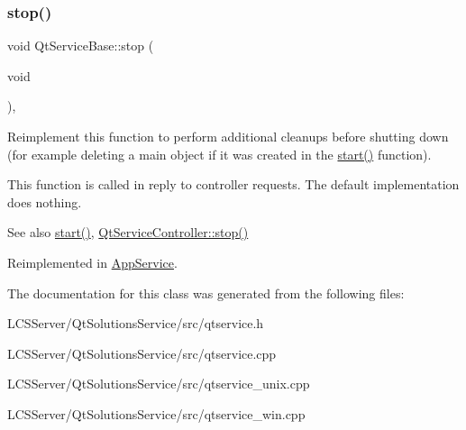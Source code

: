 \subsubsection{\texorpdfstring{stop()}{stop()}}
{\footnotesize\ttfamily void Qt\+Service\+Base\+::stop (\begin{DoxyParamCaption}\item[{void}]{ }\end{DoxyParamCaption})\hspace{0.3cm}{\ttfamily [protected]}, {\ttfamily [virtual]}}

Reimplement this function to perform additional cleanups before shutting down (for example deleting a main object if it was created in the \hyperlink{class_qt_service_base_adbc0cd621b41bd3a6a1f62fda432e9e4}{start()} function).

This function is called in reply to controller requests. The default implementation does nothing.

\begin{DoxySeeAlso}{See also}
\hyperlink{class_qt_service_base_adbc0cd621b41bd3a6a1f62fda432e9e4}{start()}, \hyperlink{class_qt_service_controller_ad06afa647666769e309474b18bf7cf90}{Qt\+Service\+Controller\+::stop()} 
\end{DoxySeeAlso}


Reimplemented in \hyperlink{class_app_service_a343b5fb7522b24f9fc6dd2aeda940f01}{App\+Service}.



The documentation for this class was generated from the following files\+:\begin{DoxyCompactItemize}
\item 
L\+C\+S\+Server/\+Qt\+Solutions\+Service/src/qtservice.\+h\item 
L\+C\+S\+Server/\+Qt\+Solutions\+Service/src/qtservice.\+cpp\item 
L\+C\+S\+Server/\+Qt\+Solutions\+Service/src/qtservice\+\_\+unix.\+cpp\item 
L\+C\+S\+Server/\+Qt\+Solutions\+Service/src/qtservice\+\_\+win.\+cpp\end{DoxyCompactItemize}
